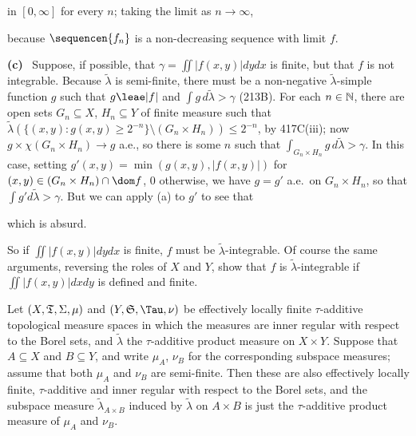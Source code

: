 {

\noindent in $[0,\infty]$ for every $n$;  taking the limit as
$n\to\infty$,


\noindent because $\sequencen{f_n}$ is a non-decreasing sequence with
limit $f$.

\medskip

{\bf (c)} \Quer\ Suppose, if possible, that $\gamma=\iint|f(x,y)|dydx$
is finite, but that $f$ is not integrable.   Because $\tilde\lambda$ is
semi-finite, there must be a non-negative $\tilde\lambda$-simple
function $g$ such that $g\leae|f|$ and
$\int g\,d\tilde\lambda>\gamma$ (213B).   For each $n\in\Bbb N$, there
are open sets $G_n\subseteq X$, $H_n\subseteq Y$ of finite measure such
that $\tilde\lambda(\{(x,y):g(x,y)\ge 2^{-n}\}\setminus(G_n\times H_n))
\le 2^{-n}$, by 417C(iii);  now $g\times\chi(G_n\times H_n)\to g$ a.e.,
so there is some $n$ such that
$\int_{G_n\times H_n}g\,d\tilde\lambda>\gamma$.   In this case, setting
$g'(x,y)=\min(g(x,y),|f(x,y)|)$ for $(x,y)\in(G_n\times H_n)\cap\dom f$,
$0$ otherwise, we have $g=g'$ a.e.\ on $G_n\times H_n$, so that
$\int g'd\tilde\lambda>\gamma$.   But we can apply (a) to $g'$ to see
that


\noindent which is absurd.\ \Bang

So if $\iint|f(x,y)|dydx$ is finite, $f$ must be
$\tilde\lambda$-integrable.   Of course the same arguments, reversing
the roles of $X$ and $Y$, show that $f$ is $\tilde\lambda$-integrable
if $\iint|f(x,y)|dxdy$ is defined and finite.
}%

 Let $(X,\frak T,\Sigma,\mu)$ and
$(Y,\frak S,\Tau,\nu)$ be effectively locally finite $\tau$-additive
topological
measure spaces in which the measures are inner regular with respect to
the Borel sets, and $\tilde\lambda$ the $\tau$-additive product measure
on $X\times Y$.   Suppose that $A\subseteq X$ and $B\subseteq Y$, and
write $\mu_A$, $\nu_B$ for the corresponding subspace measures;  assume
that both $\mu_A$ and $\nu_B$ are semi-finite.   Then these are also
effectively locally finite,
$\tau$-additive and inner regular with respect to the Borel sets, and
the subspace measure $\tilde\lambda_{A\times B}$ induced by
$\tilde\lambda$ on $A\times B$ is just the $\tau$-additive product
measure of $\mu_A$ and $\nu_B$.


